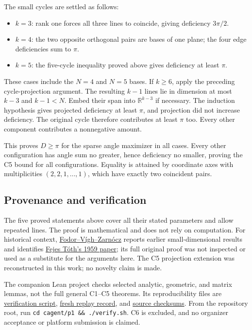 \documentclass[11pt,a4paper]{article}
\providecommand{\tightlist}{\setlength{\itemsep}{0pt}\setlength{\parskip}{0pt}}
\begin{document}
The small cycles are settled as follows:

\begin{itemize}
\tightlist
\item
  \(k=3\): rank one forces all three lines to coincide, giving deficiency \(3\pi/2\).
\item
  \(k=4\): the two opposite orthogonal pairs are bases of one plane; the four edge deficiencies sum to \(\pi\).
\item
  \(k=5\): the five-cycle inequality proved above gives deficiency at least \(\pi\).
\end{itemize}

These cases include the \(N=4\) and \(N=5\) bases. If \(k\ge6\), apply the preceding cycle-projection argument. The resulting \(k-1\) lines lie in dimension at most \(k-3\) and \(k-1<N\). Embed their span into \(\mathbb R^{k-3}\) if necessary. The induction hypothesis gives projected deficiency at least \(\pi\), and projection did not increase deficiency. The original cycle therefore contributes at least \(\pi\) too. Every other component contributes a nonnegative amount.

This proves \(D\ge\pi\) for the sparse angle maximizer in all cases. Every other configuration has angle sum no greater, hence deficiency no smaller, proving the C5 bound for all configurations. Equality is attained by coordinate axes with multiplicities \((2,2,1,\ldots,1)\), which have exactly two coincident pairs.

\subsection{Provenance and verification}\label{provenance-and-verification}

The five proved statements above cover all their stated parameters and allow repeated lines. The proof is mathematical and does not rely on computation. For historical context, \href{https://www.math.u-szeged.hu/~vigvik/preprints/egyenesekszogei.pdf}{Fodor--V\'{i}gh--Zarn\'{o}cz} reports earlier small-dimensional results and identifies \href{https://doi.org/10.1007/BF02063286}{Fejes T\'{o}th's 1959 paper}; its full original proof was not inspected or used as a substitute for the arguments here. The C5 projection extension was reconstructed in this work; no novelty claim is made.

The companion Lean project checks selected analytic, geometric, and matrix lemmas, not the full general C1--C5 theorems. Its reproducibility files are \href{https://github.com/mpelteshki/climbing-to-the-frontier/blob/212bba53b1818c08c40b8c4b48f636651eaf6410/cagent/p1/verify.sh}{verification script}, \href{https://github.com/mpelteshki/climbing-to-the-frontier/blob/212bba53b1818c08c40b8c4b48f636651eaf6410/cagent/p1/evidence/replay/README.md}{fresh replay record}, and \href{https://github.com/mpelteshki/climbing-to-the-frontier/blob/212bba53b1818c08c40b8c4b48f636651eaf6410/cagent/p1/evidence/source-sha256.txt}{source checksums}. From the repository root, run \texttt{cd\ cagent/p1\ \&\&\ ./verify.sh}. C6 is excluded, and no organizer acceptance or platform submission is claimed.
\end{document}
